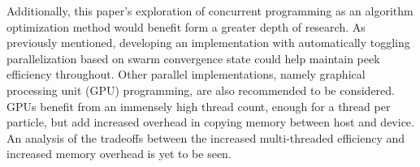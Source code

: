 \noindent Additionally, this paper's exploration of concurrent programming as an algorithm optimization method
would benefit form a greater depth of research. As previously mentioned, developing an implementation with automatically
toggling parallelization based on swarm convergence state could help maintain peek efficiency throughout.
Other parallel implementations, namely graphical processing unit (GPU) programming, are also recommended to be considered. 
GPUs benefit from an immensely high thread count, enough for a thread per particle, but add increased overhead in copying
memory between host and device. An analysis of the tradeoffs between the increased multi-threaded efficiency and 
increased memory overhead is yet to be seen.

\newpage